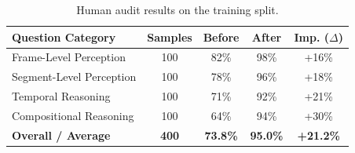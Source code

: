 \documentclass[letterpaper]{article} %
\begin{document}
\begin{table}[t]
\centering
\small
\setlength{\tabcolsep}{1mm}
\caption{Human audit results on the training split.}
\label{tab:human_audit_resize}
\begin{tabular}{lcccc}
\toprule
\textbf{Question Category} & \textbf{Samples} & \textbf{Before} & \textbf{After} & \textbf{Imp. ($\Delta$)} \\
\midrule
Frame-Level Perception & 100 & 82\% & 98\% & +16\% \\
Segment-Level Perception & 100 & 78\% & 96\% & +18\% \\
Temporal Reasoning & 100 & 71\% & 92\% & +21\% \\
Compositional Reasoning & 100 & 64\% & 94\% & +30\% \\
\midrule
\textbf{Overall / Average} & \textbf{400} & \textbf{73.8\%} & \textbf{95.0\%} & \textbf{+21.2\%} \\
\bottomrule
\end{tabular}
\end{table}
\end{document}
